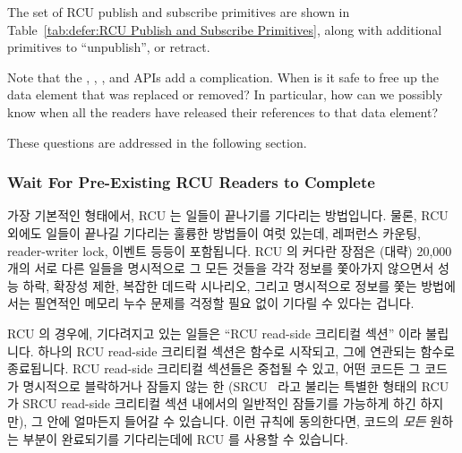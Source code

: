 The set of RCU publish and subscribe primitives are shown in
Table~\ref{tab:defer:RCU Publish and Subscribe Primitives},
along with additional primitives to ``unpublish'', or retract.

Note that the , ,
, and 
APIs add a complication.
When is it safe to free up the data element that was replaced or
removed?
In particular, how can we possibly know when all the readers
have released their references to that data element?

These questions are addressed in the following section.
\fi

\subsubsection{Wait For Pre-Existing RCU Readers to Complete}
\label{sec:defer:Wait For Pre-Existing RCU Readers to Complete}

가장 기본적인 형태에서, RCU 는 일들이 끝나기를 기다리는 방법입니다.
물론, RCU 외에도 일들이 끝나길 기다리는 훌륭한 방법들이 여럿 있는데, 레퍼런스
카운팅, reader-writer lock, 이벤트 등등이 포함됩니다.
RCU 의 커다란 장점은 (대략) 20,000 개의 서로 다른 일들을 명시적으로 그 모든
것들을 각각 정보를 쫓아가지 않으면서 성능 하락, 확장성 제한, 복잡한 데드락
시나리오, 그리고 명시적으로 정보를 쫓는 방법에서는 필연적인 메모리 누수 문제를
걱정할 필요 없이 기다릴 수 있다는 겁니다.

RCU 의 경우에, 기다려지고 있는 일들은 ``RCU read-side 크리티컬 섹션'' 이라
불립니다.
하나의 RCU read-side 크리티컬 섹션은  함수로 시작되고, 그에
연관되는  함수로 종료됩니다.
RCU read-side 크리티컬 섹션들은 중첩될 수 있고, 어떤 코드든 그 코드가
명시적으로 블락하거나 잠들지 않는 한 (SRCU~\cite{PaulEMcKenney2006c} 라고
불리는 특별한 형태의 RCU 가 SRCU read-side 크리티컬 섹션 내에서의 일반적인
잠들기를 가능하게 하긴 하지만), 그 안에 얼마든지 들어갈 수 있습니다.
이런 규칙에 동의한다면, 코드의 \emph{모든} 원하는 부분이 완료되기를
기다리는데에 RCU 를 사용할 수 있습니다.
\iffalse


